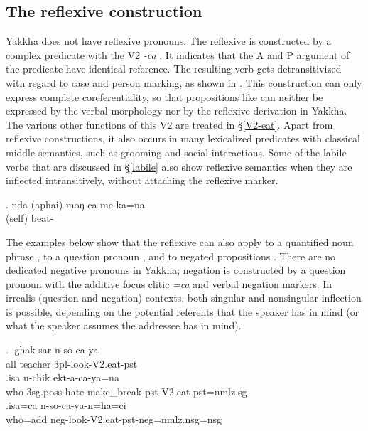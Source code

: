 \subsection{The reflexive construction}\label{refl}

Yakkha does not have reflexive pronouns. The reflexive is constructed by a complex predicate with the V2 \emph{-ca} . It indicates that the A and P argument of the predicate have identical reference.  The resulting verb gets detransitivized with regard to case and person marking, as shown in \Next. This construction can only express complete coreferentiality, so that propositions like  can neither be expressed by the verbal morphology nor by the reflexive derivation  in Yakkha.
The various other functions of this V2 are treated in §\ref{V2-eat}. Apart from reflexive constructions, it also occurs in many lexicalized predicates with classical middle semantics, such as grooming and social interactions. Some of the labile verbs that are discussed in §\ref{labile} also show reflexive semantics when they are inflected intransitively, without attaching the reflexive marker. 

\exg. nda (aphai) moŋ-ca-me-ka=na\\
 (self) beat-\\


The examples below show that the reflexive can also apply to a quantified noun phrase \Next[a], to a question pronoun \Next[b], and to negated propositions \Next[c]. There are no dedicated negative pronouns in Yakkha; negation is constructed by a question pronoun with the additive focus clitic \emph{=ca} and verbal negation markers. In irrealis (question and negation) contexts, both singular and nonsingular inflection is possible, depending on the potential referents that the speaker has in mind (or what the speaker assumes the addressee has in mind).

\ex. \ag.ghak sar n-so-ca-ya\\
		all teacher {\sc 3pl}-look-{\sc V2.eat-pst}\\
 	\bg.\label{uchik}isa u-chik ekt-a-ca-ya=na \\
	who {\sc 3sg.poss}-hate make\_break{\sc [3sg]-pst-V2.eat-pst=nmlz.sg} 	\\
	 \bg.isa=ca n-so-ca-ya-n=ha=ci \\
	who{\sc =add}  {\sc neg}-look-{\sc V2.eat-pst-neg=nmlz.nsg=nsg}	\\


